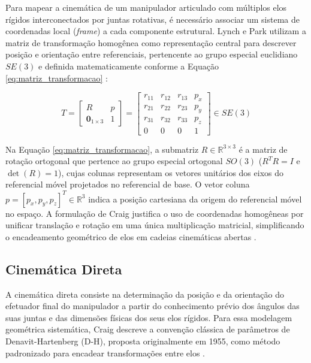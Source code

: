 Para mapear a cinemática de um manipulador articulado com múltiplos elos rígidos interconectados por juntas rotativas, é necessário associar um sistema de coordenadas local (\textit{frame}) a cada componente estrutural. Lynch e Park utilizam a matriz de transformação homogênea como representação central para descrever posição e orientação entre referenciais, pertencente ao grupo especial euclidiano $SE(3)$ e definida matematicamente conforme a Equação \ref{eq:matriz_transformacao} \cite{lynch2017modern}:

\begin{equation}
\label{eq:matriz_transformacao}
T = \begin{bmatrix}
R & p \\
\mathbf{0}_{1 \times 3} & 1
\end{bmatrix} = \begin{bmatrix}
r_{11} & r_{12} & r_{13} & p_x \\
r_{21} & r_{22} & r_{23} & p_y \\
r_{31} & r_{32} & r_{33} & p_z \\
0 & 0 & 0 & 1
\end{bmatrix} \in SE(3)
\end{equation}

Na Equação \ref{eq:matriz_transformacao}, a submatriz $R \in \mathbb{R}^{3 \times 3}$ é a matriz de rotação ortogonal que pertence ao grupo especial ortogonal $SO(3)$ ($R^T R = I$ e $\det(R) = 1$), cujas colunas representam os vetores unitários dos eixos do referencial móvel projetados no referencial de base. O vetor coluna $p = [p_x, p_y, p_z]^T \in \mathbb{R}^3$ indica a posição cartesiana da origem do referencial móvel no espaço. A formulação de Craig justifica o uso de coordenadas homogêneas por unificar translação e rotação em uma única multiplicação matricial, simplificando o encadeamento geométrico de elos em cadeias cinemáticas abertas \cite{craig2005introduction}.

\subsection{Cinemática Direta}
\label{subsec:cinematica_direta}

A cinemática direta consiste na determinação da posição e da orientação do efetuador final do manipulador a partir do conhecimento prévio dos ângulos das suas juntas e das dimensões físicas dos seus elos rígidos. Para essa modelagem geométrica sistemática, Craig descreve a convenção clássica de parâmetros de Denavit-Hartenberg (D-H), proposta originalmente em 1955, como método padronizado para encadear transformações entre elos \cite{craig2005introduction}.

